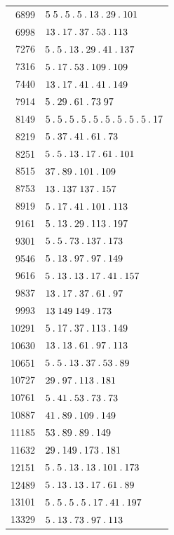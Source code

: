 \begin{longtable}{@{}r|l@{}}
6899 & $5\;5\mathbin{.} 5\mathbin{.} 5\mathbin{.} 13\mathbin{.} 29\mathbin{.} 101$\\
6998 & $13\mathbin{.} 17\mathbin{.} 37\mathbin{.} 53\mathbin{.} 113$\\
7276 & $5\mathbin{.} 5\mathbin{.} 13\mathbin{.} 29\mathbin{.} 41\mathbin{.} 137$\\
7316 & $5\mathbin{.} 17\mathbin{.} 53\mathbin{.} 109\mathbin{.} 109$\\
7440 & $13\mathbin{.} 17\mathbin{.} 41\mathbin{.} 41\mathbin{.} 149$\\
7914 & $5\mathbin{.} 29\mathbin{.} 61\mathbin{.} 73\;97$\\
8149 & $5\mathbin{.} 5\mathbin{.} 5\mathbin{.} 5\mathbin{.} 5\mathbin{.} 5\mathbin{.} 5\mathbin{.} 5\mathbin{.} 5\mathbin{.} 17$\\
8219 & $5\mathbin{.} 37\mathbin{.} 41\mathbin{.} 61\mathbin{.} 73$\\
8251 & $5\mathbin{.} 5\mathbin{.} 13\mathbin{.} 17\mathbin{.} 61\mathbin{.} 101$\\
8515 & $37\mathbin{.} 89\mathbin{.} 101\mathbin{.} 109$\\
8753 & $13\mathbin{.} 137\;137\mathbin{.} 157$\\
8919 & $5\mathbin{.} 17\mathbin{.} 41\mathbin{.} 101\mathbin{.} 113$\\
9161 & $5\mathbin{.} 13\mathbin{.} 29\mathbin{.} 113\mathbin{.} 197$\\
9301 & $5\mathbin{.} 5\mathbin{.} 73\mathbin{.} 137\mathbin{.} 173$\\
9546 & $5\mathbin{.} 13\mathbin{.} 97\mathbin{.} 97\mathbin{.} 149$\\
9616 & $5\mathbin{.} 13\mathbin{.} 13\mathbin{.} 17\mathbin{.} 41\mathbin{.} 157$\\
9837 & $13\mathbin{.} 17\mathbin{.} 37\mathbin{.} 61\mathbin{.} 97$\\
9993 & $13\;149\;149\mathbin{.} 173$\\
10291 & $5\mathbin{.} 17\mathbin{.} 37\mathbin{.} 113\mathbin{.} 149$\\
10630 & $13\mathbin{.} 13\mathbin{.} 61\mathbin{.} 97\mathbin{.} 113$\\
10651 & $5\mathbin{.} 5\mathbin{.} 13\mathbin{.} 37\mathbin{.} 53\mathbin{.} 89$\\
10727 & $29\mathbin{.} 97\mathbin{.} 113\mathbin{.} 181$\\
10761 & $5\mathbin{.} 41\mathbin{.} 53\mathbin{.} 73\mathbin{.} 73$\\
10887 & $41\mathbin{.} 89\mathbin{.} 109\mathbin{.} 149$\\
11185 & $53\mathbin{.} 89\mathbin{.} 89\mathbin{.} 149$\\
11632 & $29\mathbin{.} 149\mathbin{.} 173\mathbin{.} 181$\\
12151 & $5\mathbin{.} 5\mathbin{.} 13\mathbin{.} 13\mathbin{.} 101\mathbin{.} 173$\\
12489 & $5\mathbin{.} 13\mathbin{.} 13\mathbin{.} 17\mathbin{.} 61\mathbin{.} 89$\\
13101 & $5\mathbin{.} 5\mathbin{.} 5\mathbin{.} 5\mathbin{.} 17\mathbin{.} 41\mathbin{.} 197$\\
13329 & $5\mathbin{.} 13\mathbin{.} 73\mathbin{.} 97\mathbin{.} 113$\\

\end{longtable}
